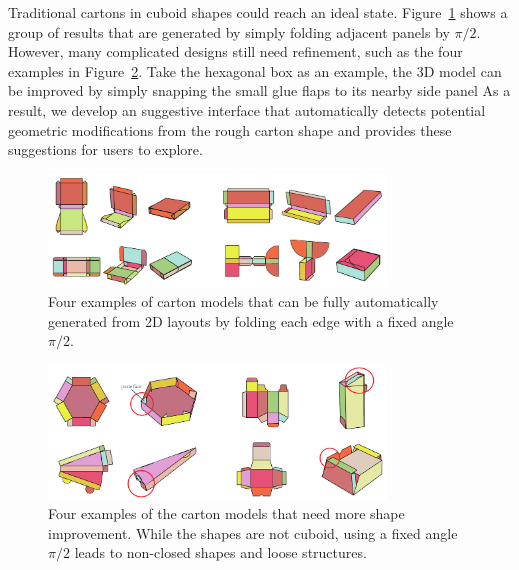 Traditional cartons in cuboid shapes could reach an ideal state.
Figure~\ref{fig:initial-automatic} shows a group of results that are generated by simply folding adjacent panels by $\pi/2$.
%
However, many complicated designs still need refinement, such as the four examples in Figure~\ref{fig:initial-need-improvement}. 
Take the hexagonal box as an example, the 3D model can be improved by simply snapping the small glue flaps to its nearby side panel 
%
As a result, we develop an suggestive interface that automatically detects potential geometric modifications from the rough carton shape and provides these suggestions for users to explore.

\begin{figure}
	\centering
	\includegraphics[width=0.8\textwidth]{images/initiala}
	\caption{Four examples of carton models that can be fully automatically generated from 2D layouts by folding each edge with a fixed angle $\pi/2$. }
	\label{fig:initial-automatic}
\end{figure}

 
\begin{figure}
	\centering
	\includegraphics[width=0.8\textwidth]{images/initialb}
	\caption{Four examples of the carton models that need more shape improvement. While the shapes are not cuboid, using a fixed angle $\pi/2$ leads to non-closed shapes and loose structures. }
	\label{fig:initial-need-improvement}
\end{figure}
